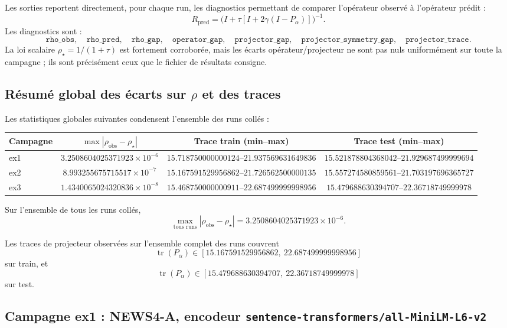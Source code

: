Les sorties reportent directement, pour chaque run, les diagnostics permettant de comparer l’opérateur observé à l’opérateur prédit :
\[
R_{\mathrm{pred}} = \bigl(I+\tau[I+2\gamma(I-P_\alpha)]\bigr)^{-1}.
\]
Les diagnostics sont :
\[
\texttt{rho\_obs},\quad \texttt{rho\_pred},\quad
\texttt{rho\_gap},\quad
\texttt{operator\_gap},\quad
\texttt{projector\_gap},\quad
\texttt{projector\_symmetry\_gap},\quad
\texttt{projector\_trace}.
\]
La loi scalaire \(\rho_\star=1/(1+\tau)\) est fortement corroborée, mais les écarts opérateur/projecteur ne sont pas nuls uniformément sur toute la campagne ; ils sont précisément ceux que le fichier de résultats consigne.

\subsection{Résumé global des écarts sur \(\rho\) et des traces}

Les statistiques globales suivantes condensent l’ensemble des runs collés :

\begin{center}
\small
\begin{tabular}{lccc}
\hline
Campagne & \(\max |\rho_{\mathrm{obs}}-\rho_\star|\) & Trace train (min--max) & Trace test (min--max) \\
\hline
ex1 & \(3.2508604025371923\times 10^{-6}\) & \(15.718750000000124\)--\(21.937569631649836\) & \(15.521878804368042\)--\(21.929687499999694\) \\
ex2 & \(8.993255675715517\times 10^{-7}\) & \(15.167591529956862\)--\(21.726562500000135\) & \(15.557274580859561\)--\(21.703197696365727\) \\
ex3 & \(1.4340065024320836\times 10^{-8}\) & \(15.468750000000911\)--\(22.687499999998956\) & \(15.479688630394707\)--\(22.36718749999978\) \\
\hline
\end{tabular}
\end{center}

Sur l’ensemble de tous les runs collés,
\[
\max_{\text{tous runs}}|\rho_{\mathrm{obs}}-\rho_\star|
=
3.2508604025371923\times 10^{-6}.
\]

Les traces de projecteur observées sur l’ensemble complet des runs couvrent
\[
\operatorname{tr}(P_\alpha)\in
[15.167591529956862,\ 22.687499999998956]
\]
sur train, et
\[
\operatorname{tr}(P_\alpha)\in
[15.479688630394707,\ 22.36718749999978]
\]
sur test.

\subsection{Campagne ex1 : NEWS4-A, encodeur \texttt{sentence-transformers/all-MiniLM-L6-v2}}

